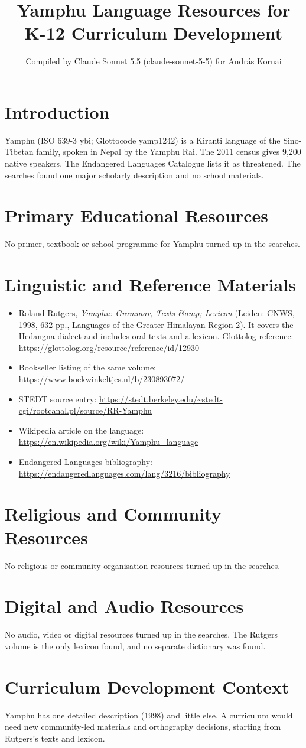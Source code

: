 \documentclass[12pt]{article}
\title{Yamphu Language Resources for K-12 Curriculum Development}
\author{Compiled by Claude Sonnet 5.5 (claude-sonnet-5-5) for Andr\'as Kornai}
\date{}
\begin{document}
\maketitle

\section{Introduction}
Yamphu (ISO 639-3 ybi; Glottocode yamp1242) is a Kiranti language of the Sino-Tibetan family, spoken in Nepal by the Yamphu Rai. The 2011 census gives 9,200 native speakers. The Endangered Languages Catalogue lists it as threatened. The searches found one major scholarly description and no school materials.

\section{Primary Educational Resources}
No primer, textbook or school programme for Yamphu turned up in the searches.

\section{Linguistic and Reference Materials}
\begin{itemize}
\item Roland Rutgers, \emph{Yamphu: Grammar, Texts \&amp; Lexicon} (Leiden: CNWS, 1998, 632 pp., Languages of the Greater Himalayan Region 2). It covers the Hedangna dialect and includes oral texts and a lexicon. Glottolog reference: \url{https://glottolog.org/resource/reference/id/12930}
\item Bookseller listing of the same volume: \url{https://www.boekwinkeltjes.nl/b/230893072/}
\item STEDT source entry: \url{https://stedt.berkeley.edu/~stedt-cgi/rootcanal.pl/source/RR-Yamphu}
\item Wikipedia article on the language: \url{https://en.wikipedia.org/wiki/Yamphu_language}
\item Endangered Languages bibliography: \url{https://endangeredlanguages.com/lang/3216/bibliography}
\end{itemize}

\section{Religious and Community Resources}
No religious or community-organisation resources turned up in the searches.

\section{Digital and Audio Resources}
No audio, video or digital resources turned up in the searches. The Rutgers volume is the only lexicon found, and no separate dictionary was found.

\section{Curriculum Development Context}
Yamphu has one detailed description (1998) and little else. A curriculum would need new community-led materials and orthography decisions, starting from Rutgers's texts and lexicon.
\end{document}
